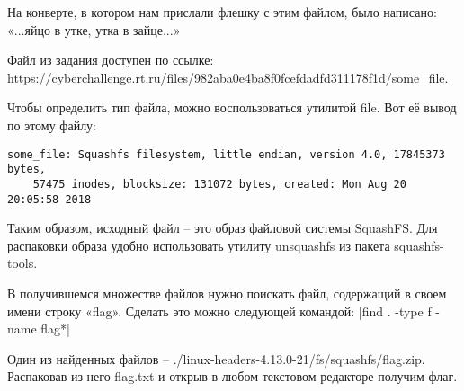 
На конверте, в котором нам прислали флешку с этим файлом, было написано: «...яйцо в утке, утка в зайце...»

Файл из задания доступен по ссылке: \url{https://cyberchallenge.rt.ru/files/982aba0e4ba8f0fcefdadfd311178f1d/some_file}.

\solutionSection

Чтобы определить тип файла, можно воспользоваться утилитой file. Вот её вывод по этому файлу:
\begin{verbatim}
some_file: Squashfs filesystem, little endian, version 4.0, 17845373 bytes, 
    57475 inodes, blocksize: 131072 bytes, created: Mon Aug 20 20:05:58 2018
\end{verbatim}

Таким образом, исходный файл – это образ файловой системы SquashFS. Для распаковки образа удобно использовать утилиту unsquashfs из пакета squashfs-tools.

В получившемся множестве файлов нужно поискать файл, содержащий в своем имени строку «flag». Сделать это можно следующей командой:
|find . -type f -name flag*|

Один из найденных файлов –  ./linux-headers-4.13.0-21/fs/squashfs/flag.zip. Распаковав из него flag.txt и открыв в любом текстовом редакторе получим флаг.

